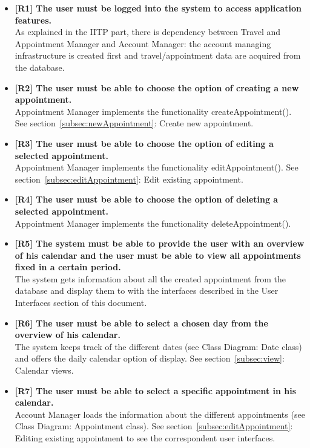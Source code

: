 \begin{itemize}
	\item \textbf{[R1] The user must be logged into the system to access application features.}\\
As explained in the IITP part, there is dependency between Travel and Appointment Manager and Account Manager: the account managing infrastructure is created first and travel/appointment data are acquired from the database.

\item \textbf{[R2] The user must be able to choose the option of creating a new appointment.}\\
Appointment Manager implements the functionality createAppointment(). See section~\ref{subsec:newAppointment}: Create new appointment.

\item \textbf{[R3] The user must be able to choose the option of editing a selected appointment.}\\
Appointment Manager implements the functionality editAppointment(). See section~\ref{subsec:editAppointment}: Edit existing appointment.

\item \textbf{[R4] The user must be able to choose the option of deleting a selected appointment.}\\
Appointment Manager implements the functionality deleteAppointment().

\item \textbf{[R5] The system must be able to provide the user with an overview of his calendar and the user
must be able to view all appointments fixed in a certain period.}\\
The system gets information about all the created appointment from the database and display them to with the interfaces described in the User Interfaces section of this document.

\item \textbf{[R6] The user must be able to select a chosen day from the overview of his calendar.}\\
The system keeps track of the different dates (see Class Diagram: Date class) and offers the daily calendar option of display. See section~\ref{subsec:view}: Calendar views.

\item \textbf{[R7] The user must be able to select a specific appointment in his calendar.}\\
Account Manager loads the information about the different appointments (see Class Diagram: Appointment class). See section~\ref{subsec:editAppointment}: Editing existing appointment to see the correspondent user interfaces.


\end{itemize}
